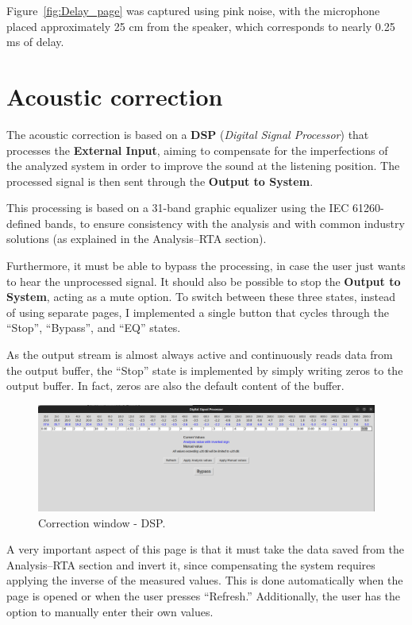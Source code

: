 Figure~\ref{fig:Delay_page} was captured using pink noise, with the microphone placed approximately 25 cm from the speaker, which corresponds to nearly 0.25 ms of delay.


\section{Acoustic correction}

The acoustic correction is based on a \textbf{DSP} (\textit{Digital Signal Processor}) that processes the \textbf{External Input}, aiming to compensate for the imperfections of the analyzed system in order to improve the sound at the listening position. The processed signal is then sent through the \textbf{Output to System}.

This processing is based on a 31-band graphic equalizer using the IEC 61260-defined bands, to ensure consistency with the analysis and with common industry solutions (as explained in the Analysis–RTA section).

Furthermore, it must be able to bypass the processing, in case the user just wants to hear the unprocessed signal. It should also be possible to stop the \textbf{Output to System}, acting as a mute option. To switch between these three states, instead of using separate pages, I implemented a single button that cycles through the “Stop”, “Bypass”, and “EQ” states.

As the output stream is almost always active and continuously reads data from the output buffer, the “Stop” state is implemented by simply writing zeros to the output buffer. In fact, zeros are also the default content of the buffer.

\begin{figure}[H]
	\centering
	\includegraphics[width=1
	\linewidth]{Figures/DSP_page.png}
	\caption{Correction window - DSP.}
	\label{fig:DSP_page}
\end{figure}

A very important aspect of this page is that it must take the data saved from the Analysis–RTA section and invert it, since compensating the system requires applying the inverse of the measured values. This is done automatically when the page is opened or when the user presses “Refresh.” Additionally, the user has the option to manually enter their own values.


